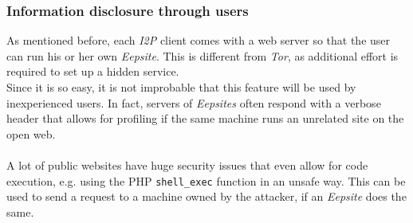 \documentclass{sig-alternate}
\begin{document}
\subsubsection{Information disclosure through users}
As mentioned before, each \emph{I2P} client comes with a web server so that the user can run his or her own \emph{Eepsite}.
This is different from \emph{Tor}, as additional effort is required to set up a hidden service.
\\
Since it is so easy, it is not improbable that this feature will be used by inexperienced users.
In fact, servers of \emph{Eepsites} often respond with a verbose header that allows for profiling if the same machine runs an unrelated site on the open web.
\\
\\
A lot of public websites have huge security issues that even allow for code execution, e.g. using the PHP \texttt{shell\_exec} function in an unsafe way.
This can be used to send a request to a machine owned by the attacker, if an \emph{Eepsite} does the same\cite{crenshaw2011}.




%
\end{document}

